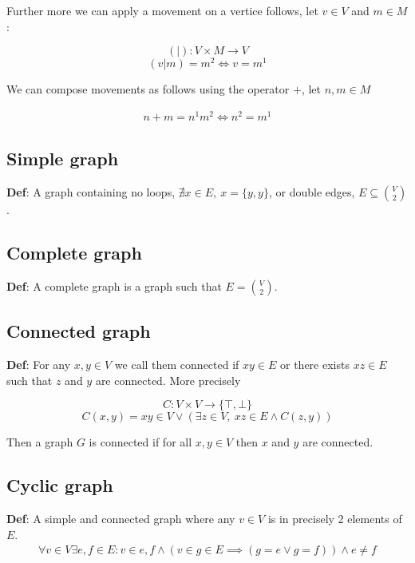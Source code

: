 \documentclass{article}
\begin{document}
Further more we can apply a movement on a vertice follows, let $v \in V$ and
$m \in M$:

\begin{equation}
	(|): V \times M \rightarrow V 
\end{equation}
\begin{equation}
	(v|m) = m^2 \Leftrightarrow v = m^1 \nonumber
\end{equation}

We can compose movements as follows using the operator $+$, let $n,m \in M$

\begin{align}
	n+m = n^1m^2 \Leftrightarrow n^2 = m^1
\end{align}

\subsection{Simple graph}
\textbf{Def}: A graph containing no loops, $\nexists x \in E,\ x = \{y,y\}$, or 
double edges, $E \subseteq \binom{V}{2}$.

\subsection{Complete graph}
\textbf{Def}: A complete graph is a graph such that $E = \binom{V}{2}$.

\subsection{Connected graph}
\textbf{Def}: For any $x,y \in V$ we call them connected if $xy \in E$ or there
exists $xz \in E$ such that $z$ and $y$ are connected. More precisely

\begin{equation}
	C: V \times V \rightarrow \{\top,\bot\}
\end{equation}
\begin{equation}
	C(x,y) = xy \in V \lor (\exists z \in V,\ xz \in E \land C(z,y)) \nonumber
\end{equation}

Then a graph $G$ is connected if for all $x,y \in V$ then $x$ and $y$ are
connected.

\subsection{Cyclic graph}
\textbf{Def}: A simple and connected graph where any $v\in V$ is in precisely 2
elements of $E$.
\begin{align*}
	\forall v \in V \exists e,f\in E: v\in e,f \land (v \in g \in E \implies (g
	=e \lor g = f)) \land e \neq f
\end{align*}
\end{document}
